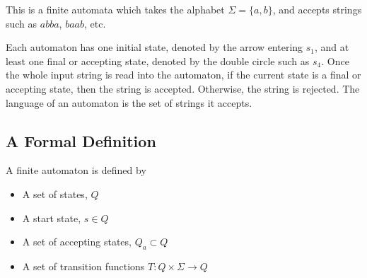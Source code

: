 \begin{example*}{}{}
  \centering

  This is a finite automata which takes the alphabet $\Sigma = \{a, b\}$, and accepts strings such as $abba$, $baab$, etc.
\end{example*}

Each automaton has one initial state, denoted by the arrow entering $s_1$, and at least one final or accepting state,
 denoted by the double circle such as $s_4$. Once the whole input string is read into the automaton, if the current
 state is a final or accepting state, then the string is accepted. Otherwise, the string is rejected. The language of
 an automaton is the set of strings it accepts.

\subsection*{A Formal Definition}

\begin{definition*}{}{}
  A finite automaton is defined by
  \begin{itemize}
    \item A set of states, $Q$
    \item A start state, $s \in Q$
    \item A set of accepting states, $Q_a \subset Q$
    \item A set of transition functions $T : Q \times \Sigma \rightarrow Q$
  \end{itemize}
\end{definition*}

